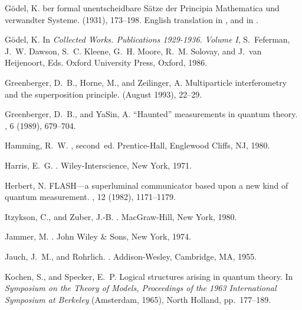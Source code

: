 \begin{thebibliography}{100}
{\sc G{\"{o}}del, K.}
ber formal unentscheidbare {S\"{a}}tze der {P}rincipia
  {M}athematica und verwandter {S}ysteme.
 (1931),
  173--198.
\newblock English translation in \cite{godel-ges1}, and in \cite{davis}.

{\sc G{\"{o}}del, K.}
\newblock In {\em Collected Works. Publications 1929-1936. Volume {I}},
  S.~Feferman, J.~W. Dawson, S.~C. Kleene, G.~H. Moore, R.~M. Solovay, and
  J.~van Heijenoort, Eds. Oxford University Press, Oxford, 1986.

{\sc Greenberger, D.~B., Horne, M., and Zeilinger, A.}
\newblock Multiparticle interferometry and the superposition principle.
 (August 1993), 22--29.

{\sc Greenberger, D.~B., and YaSin, A.}
\newblock ``{H}aunted'' measurements in quantum theory.
, 6 (1989), 679--704.

{\sc Hamming, R.~W.}
, second~ed.
\newblock Prentice-Hall, Englewood Cliffs, NJ, 1980.

{\sc Harris, E.~G.}
.
\newblock Wiley-Interscience, New York, 1971.

{\sc Herbert, N.}
\newblock FLASH---a superluminal communicator based upon a new kind of
quantum
  measurement.
, 12 (1982), 1171--1179.

{\sc Itzykson, C., and Zuber, J.-B.}
.
\newblock MacGraw-Hill, New York, 1980.

{\sc Jammer, M.}
.
\newblock John Wiley \& Sons, New York, 1974.

{\sc Jauch, J.~M., and Rohrlich}.
.
\newblock Addison-Wesley, Cambridge, MA, 1955.

{\sc Kochen, S., and Specker, E.~P.}
\newblock Logical structures arising in quantum theory.
\newblock In {\em Symposium on the Theory of Models, Proceedings of the 1963
  International Symposium at Berkeley\/} (Amsterdam, 1965), North Holland,
  pp.~177--189.


\end{thebibliography}
